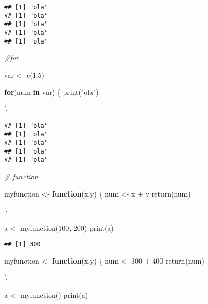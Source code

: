 \documentclass[
]{article}
\newenvironment{Shaded}{\begin{snugshade}}{\end{snugshade}}
\newcommand{\CommentTok}[1]{\textcolor[rgb]{0.56,0.35,0.01}{\textit{#1}}}
\newcommand{\ControlFlowTok}[1]{\textcolor[rgb]{0.13,0.29,0.53}{\textbf{#1}}}
\newcommand{\DecValTok}[1]{\textcolor[rgb]{0.00,0.00,0.81}{#1}}
\newcommand{\FunctionTok}[1]{\textcolor[rgb]{0.00,0.00,0.00}{#1}}
\newcommand{\NormalTok}[1]{#1}
\newcommand{\OtherTok}[1]{\textcolor[rgb]{0.56,0.35,0.01}{#1}}
\newcommand{\SpecialCharTok}[1]{\textcolor[rgb]{0.00,0.00,0.00}{#1}}
\newcommand{\StringTok}[1]{\textcolor[rgb]{0.31,0.60,0.02}{#1}}
\begin{document}
\begin{verbatim}
## [1] "ola"
## [1] "ola"
## [1] "ola"
## [1] "ola"
## [1] "ola"
\end{verbatim}

\begin{Shaded}
\begin{Highlighting}[]
\CommentTok{\#for}

\NormalTok{var }\OtherTok{\textless{}{-}} \FunctionTok{c}\NormalTok{(}\DecValTok{1}\SpecialCharTok{:}\DecValTok{5}\NormalTok{)}

\ControlFlowTok{for}\NormalTok{(num }\ControlFlowTok{in}\NormalTok{ var)}
\NormalTok{\{}
  \FunctionTok{print}\NormalTok{(}\StringTok{"ola"}\NormalTok{)}
  
\NormalTok{\}}
\end{Highlighting}
\end{Shaded}

\begin{verbatim}
## [1] "ola"
## [1] "ola"
## [1] "ola"
## [1] "ola"
## [1] "ola"
\end{verbatim}

\begin{Shaded}
\begin{Highlighting}[]
\CommentTok{\# function}

\NormalTok{myfunction }\OtherTok{\textless{}{-}} \ControlFlowTok{function}\NormalTok{(x,y)}
\NormalTok{\{}
\NormalTok{  num }\OtherTok{\textless{}{-}}\NormalTok{ x }\SpecialCharTok{+}\NormalTok{ y}
  \FunctionTok{return}\NormalTok{(num)}
  
\NormalTok{\}}

\NormalTok{a }\OtherTok{\textless{}{-}} \FunctionTok{myfunction}\NormalTok{(}\DecValTok{100}\NormalTok{, }\DecValTok{200}\NormalTok{)}
\FunctionTok{print}\NormalTok{(a)}
\end{Highlighting}
\end{Shaded}

\begin{verbatim}
## [1] 300
\end{verbatim}

\begin{Shaded}
\begin{Highlighting}[]
\NormalTok{myfunction }\OtherTok{\textless{}{-}} \ControlFlowTok{function}\NormalTok{(x,y)}
\NormalTok{\{}
\NormalTok{  num }\OtherTok{\textless{}{-}} \DecValTok{300} \SpecialCharTok{+} \DecValTok{400}
  \FunctionTok{return}\NormalTok{(num)}
  
\NormalTok{\}}

\NormalTok{a }\OtherTok{\textless{}{-}} \FunctionTok{myfunction}\NormalTok{()}
\FunctionTok{print}\NormalTok{(a)}
\end{Highlighting}
\end{Shaded}
\end{document}
